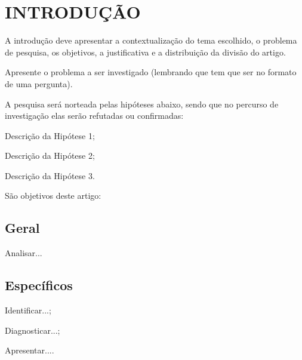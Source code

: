 \chapter{INTRODUÇÃO}
A introdução deve apresentar a contextualização do tema escolhido, o problema de pesquisa, os objetivos, a justificativa e a distribuição da divisão do artigo.

Apresente o problema a ser investigado (lembrando que tem que ser no formato de uma pergunta).

A pesquisa será norteada pelas hipóteses abaixo, sendo que no percurso de investigação elas serão refutadas ou confirmadas:
\begin{uemaenum}
    \item Descrição da Hipótese 1;
    \item Descrição da Hipótese 2;
    \item Descrição da Hipótese 3.
\end{uemaenum}

São objetivos deste artigo:

\section{Geral}
Analisar...

\section{Específicos}
\begin{uemaenum}
    \item Identificar...;
    \item Diagnosticar...;
    \item Apresentar....
\end{uemaenum}

